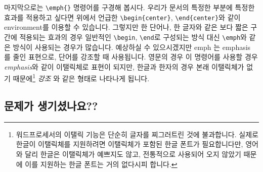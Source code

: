 마지막으로는 \verb|\emph{}| 명령어를 구경해 봅시다.
우리가 문서의 특정한 부분에 특정한 효과를 적용하고 싶다면 위에서 언급한 \verb|\begin{center}|, \verb|\end{center}|와 같이 environment를 이용할 수 있습니다.
그렇지만 한 단어나, 한 글자와 같은 보다 짧은 구간에 적용되는 효과의 경우 일반적인 \verb|\begin|, \verb|\end|로 구성되는 방식 대신 \verb|\emph|와 같은 방식이 사용되는 경우가 많습니다.
예상하실 수 있으시겠지만 emph 는 emphasis 를 줄인 표현으로, 단어를 강조할 때 사용됩니다. 영문의 경우 이 명령어를 사용할 경우 \emph{emphasis}와 같이 이탤릭체로 표현이 되지만, 한글과 한자의 경우 본래 이탤릭체가 없기 때문에\footnote{워드프로세서의 이탤릭 기능은 단순히 글자를 찌그러트린 것에 불과합니다. 실제로 한글이 이탤릭체를 지원하려면 이탤릭체가 포함된 한글 폰트가 필요합니다만, 영어와 달리 한글은 이탤릭체가 예쁘지도 않고, 전통적으로 사용되어 오지 않았기 때문에 이를 지원하는 한글 폰트는 거의 없다시피 합니다.} \emph{강조} 와 같은 형태로 나타나게 됩니다.

\subsection{문제가 생기셨나요??}
\label{sec:text-help}




